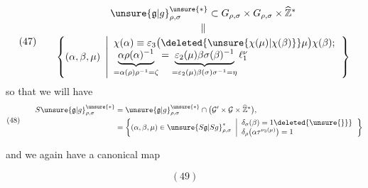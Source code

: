 \[
(47)\qquad
\begin{gathered}
\unsure{\mathfrak{g}|g}_{\rho,\sigma}^{\unsure{*}}
\subset G_{\rho,\sigma}\times G_{\rho,\sigma}
\times\widehat{\mathbb Z}^{*}
\\[-2pt]
\Vert\\[-2pt]
\left\{(\alpha,\beta,\mu)\ \left|
\begin{array}{l}
\chi(\alpha)\equiv\varepsilon_3
\bigl(\deleted{\unsure{\chi(\mu)|\chi(\beta)}}\mu\bigr)
\chi(\beta);\\
\underbrace{\alpha\rho(\alpha)^{-1}}_{=\alpha(\rho)\rho^{-1}=\zeta}
=
\underbrace{\varepsilon_2(\mu)\beta\sigma(\beta)^{-1}}_
{=\varepsilon_2(\mu)\beta(\sigma)\sigma^{-1}=\eta}
\ell_1^\nu
\end{array}\right.\right\}
\end{gathered}
\]
so that we will have
\[
(48)\qquad
\begin{aligned}
S\unsure{\mathfrak{g}|g}_{\rho,\sigma}^{\unsure{*}}
&=\unsure{\mathfrak{g}|g}_{\rho,\sigma}^{\unsure{*}}
\cap\bigl(\mathcal{G}'\times\mathcal{G}\times\widehat{\mathbb Z}^{*}\bigr),
\\
&=\left\{(\alpha,\beta,\mu)\in
\unsure{S\mathfrak{g}|Sg}_{\rho,\sigma}^{*}
\ \left|
\begin{array}{l}
\delta_\sigma(\beta)=1\deleted{\unsure{\}}}\\
\delta_\rho\bigl(\alpha\tau^{\nu_3(\mu)}\bigr)=1
\end{array}\right.\right\}
\end{aligned}
\]


and we again have a canonical map
\begin{samepage}
\[
(49)
\]
\end{samepage}

